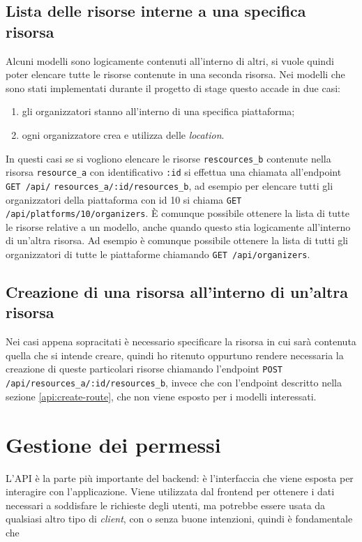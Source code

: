 \subsection{Lista delle risorse interne a una specifica risorsa}
Alcuni modelli sono logicamente contenuti all'interno di altri, si vuole quindi poter elencare tutte le risorse contenute in una seconda risorsa. Nei modelli che sono stati implementati durante il progetto di stage questo accade in due casi:
\begin{enumerate}
	\item gli organizzatori stanno all'interno di una specifica piattaforma;
	\item ogni organizzatore crea e utilizza delle \emph{location}.
\end{enumerate} In questi casi se si vogliono elencare le risorse \verb|rescources_b| contenute nella risorsa \verb|resource_a| con identificativo \verb|:id| si effettua una chiamata all'endpoint \verb|GET /api/| \verb|resources_a/:id/resources_b|, ad esempio per elencare tutti gli organizzatori della piattaforma con id 10 si chiama \verb|GET /api/platforms/10/organizers|. È comunque possibile ottenere la lista di tutte le risorse relative a un modello, anche quando questo stia logicamente all'interno di un'altra risorsa. Ad esempio è comunque possibile ottenere la lista di tutti gli organizzatori di tutte le piattaforme chiamando \verb|GET /api/organizers|.

\subsection{Creazione di una risorsa all'interno di un'altra risorsa}
Nei casi appena sopracitati è necessario specificare la risorsa in cui sarà contenuta quella che si intende creare, quindi ho ritenuto oppurtuno rendere necessaria la creazione di queste particolari risorse chiamando l'endpoint \verb|POST /api/resources_a/:id/resources_b|, invece che con l'endpoint descritto nella sezione \ref{api:create-route}, che non viene esposto per i modelli interessati.


\section{Gestione dei permessi}

L'API è la parte più importante del backend: è l'interfaccia che viene esposta per interagire con l'applicazione. Viene utilizzata dal frontend per ottenere i dati necessari a soddisfare le richieste degli utenti, ma potrebbe essere usata da qualsiasi altro tipo di \emph{client}, con o senza buone intenzioni, quindi è fondamentale che 
